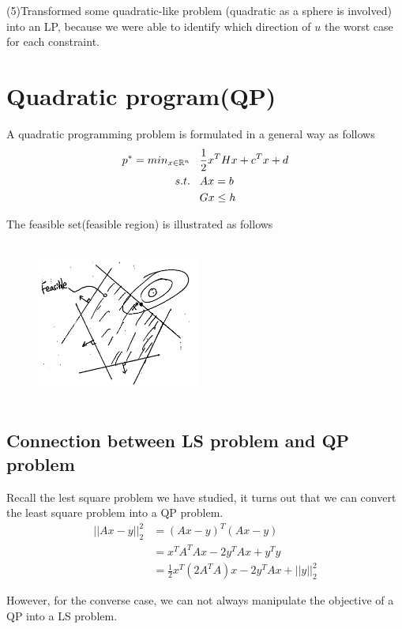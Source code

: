 (5)Transformed some quadratic-like problem (quadratic as a sphere is involved) into an LP, because we were able to identify which direction of $u$ the worst case for each constraint.






\newpage

\section{Quadratic program(QP)}

A quadratic programming problem is formulated in a general way as follows
\begin{align*}
p^* = min_{x\in \mathbb{R}^n}\,\,\,\,\, &\frac{1}{2}x^THx + c^Tx + d\\
 s.t.\,\,\,\,\, &Ax = b\\
 &Gx\leq h
\end{align*}

The feasible set(feasible region) is illustrated as follows
\begin{figure}
	\centering
	\includegraphics[width=2.1in,height=2.1in]{figures/ch07/figure1016_a.png}
\end{figure}

\subsection{Connection between LS problem and QP problem}
Recall the lest square problem we have studied, it turns out that we can convert the least square problem into a QP problem.
\begin{align*}
||Ax - y||_2^2 &= (Ax - y)^T(Ax - y)\\
&= x^TA^TAx - 2y^TAx + y^Ty\\
&= \frac{1}{2}x^T(2A^TA)x - 2y^TAx + ||y||_2^2
\end{align*}

However, for the converse case, we can not always manipulate the objective of a QP into a  LS problem.


